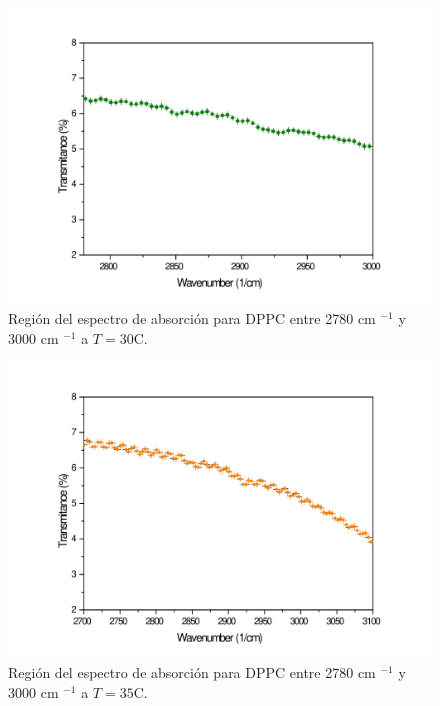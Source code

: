 \documentclass[%
 reprint,
 amsmath,amssymb,
 aps,
]{revtex4-2}
\begin{document}
\begin{figure}[ht]
\includegraphics[scale=0.25]{FTIR/30C.pdf}
  \caption{Regi\'{o}n del espectro de absorci\'{o}n para DPPC entre 2780 cm $^{-1}$ y 3000 cm $^{-1}$ a $T=30$\textdegree C.}
  \label{fig:espa30}
\end{figure}
\begin{figure}[ht]
\includegraphics[scale=0.25]{FTIR/35C.pdf}
  \caption{Regi\'{o}n del espectro de absorci\'{o}n para DPPC entre 2780 cm $^{-1}$ y 3000 cm $^{-1}$ a $T=35$\textdegree C.}
  \label{fig:espa35}
\end{figure}


\end{document}
